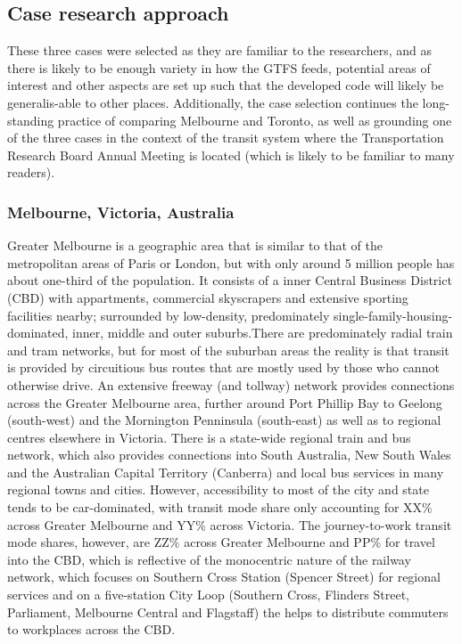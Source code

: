 \documentclass[numbered]{trbunofficial}
\begin{document}
\hypertarget{case-research-approach}{%
\subsection{Case research approach}\label{case-research-approach}}

These three cases were selected as they are familiar to the researchers,
and as there is likely to be enough variety in how the GTFS feeds,
potential areas of interest and other aspects are set up such that the
developed code will likely be generalis-able to other places.
Additionally, the case selection continues the long-standing practice of
comparing Melbourne and Toronto, as well as grounding one of the three
cases in the context of the transit system where the Transportation
Research Board Annual Meeting is located (which is likely to be familiar
to many readers).

\hypertarget{melbourne-victoria-australia}{%
\subsubsection{Melbourne, Victoria,
Australia}\label{melbourne-victoria-australia}}

Greater Melbourne is a geographic area that is similar to that of the
metropolitan areas of Paris or London, but with only around 5 million
people has about one-third of the population. It consists of a inner
Central Business District (CBD) with appartments, commercial skyscrapers
and extensive sporting facilities nearby; surrounded by low-density,
predominately single-family-housing-dominated, inner, middle and outer
suburbs.There are predominately radial train and tram networks, but for
most of the suburban areas the reality is that transit is provided by
circuitious bus routes that are mostly used by those who cannot
otherwise drive. An extensive freeway (and tollway) network provides
connections across the Greater Melbourne area, further around Port
Phillip Bay to Geelong (south-west) and the Mornington Penninsula
(south-east) as well as to regional centres elsewhere in Victoria. There
is a state-wide regional train and bus network, which also provides
connections into South Australia, New South Wales and the Australian
Capital Territory (Canberra) and local bus services in many regional
towns and cities. However, accessibility to most of the city and state
tends to be car-dominated, with transit mode share only accounting for
XX\% across Greater Melbourne and YY\% across Victoria. The
journey-to-work transit mode shares, however, are ZZ\% across Greater
Melbourne and PP\% for travel into the CBD, which is reflective of the
monocentric nature of the railway network, which focuses on Southern
Cross Station (Spencer Street) for regional services and on a
five-station City Loop (Southern Cross, Flinders Street, Parliament,
Melbourne Central and Flagstaff) the helps to distribute commuters to
workplaces across the CBD.
\end{document}
